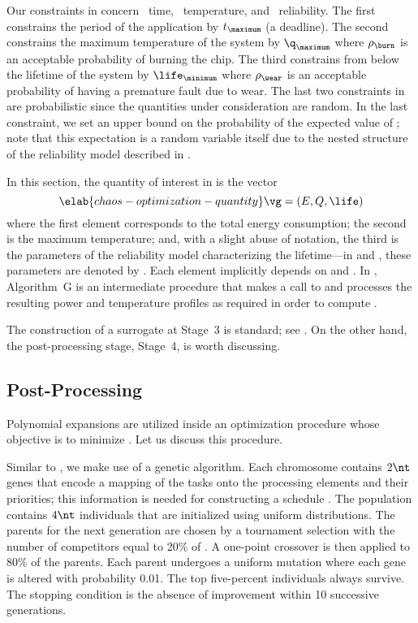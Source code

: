 Our constraints in  concern \one~time,
\two~temperature, and \three~reliability. The first constrains the period of the
application by $t_\maximum$ (a deadline). The second constrains the maximum
temperature of the system by $\q_\maximum$ where $\rho_\burn$ is an acceptable
probability of burning the chip. The third constrains from below the lifetime of
the system by $\life_\minimum$ where $\rho_\wear$ is an acceptable probability
of having a premature fault due to wear. The last two constraints in
 are probabilistic since the quantities
under consideration are random. In the last constraint, we set an upper bound on
the probability of the expected value of \life; note that this expectation is a
random variable itself due to the nested structure of the reliability model
described in .

In this section, the quantity of interest \g in  is the
vector
\begin{equation} \elab{chaos-optimization-quantity}
  \vg = (E, Q, \life)
\end{equation}
where the first element corresponds to the total energy consumption; the second
is the maximum temperature; and, with a slight abuse of notation, the third is
the parameters of the reliability model characterizing the lifetime---in
 and , these
parameters are denoted by \vg. Each element implicitly depends on \schedule and
\vu. In , Algorithm~G is an intermediate procedure that
makes a call to  and processes the
resulting power and temperature profiles as required in order to compute \vg.

The construction of a surrogate at Stage~3 is standard; see
. On the other hand, the post-processing
stage, Stage~4, is worth discussing.

\subsection{Post-Processing}

Polynomial expansions are utilized inside an optimization procedure whose
objective is to minimize . Let us discuss
this procedure.

Similar to , we make use of a genetic algorithm.
Each chromosome contains $2 \nt$ genes that encode a mapping of the tasks onto
the processing elements and their priorities; this information is needed for
constructing a schedule \schedule. The population contains $4 \nt$ individuals
that are initialized using uniform distributions. The parents for the next
generation are chosen by a tournament selection with the number of competitors
equal to 20\% of \nt. A one-point crossover is then applied to 80\% of the
parents. Each parent undergoes a uniform mutation where each gene is altered
with probability 0.01. The top five-percent individuals always survive. The
stopping condition is the absence of improvement within 10 successive
generations.

